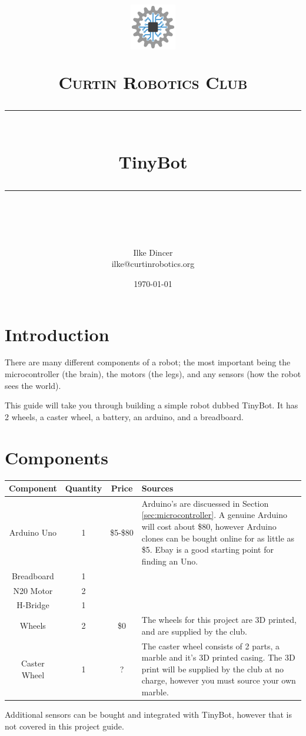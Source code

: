 \documentclass[a4paper,12pt]{article}
\title{	
    \begin{center}
        \includegraphics[width=0.15\textwidth]{CRoCLogo(mediumquality).png}
    \end{center}
	\normalfont\normalsize
	\textsc{Curtin Robotics Club}\\ %
	\vspace{25pt} %
	\rule{\linewidth}{0.5pt}\\ %
	\vspace{20pt} %
    {\huge TinyBot }\\
	\vspace{12pt} %
	\rule{\linewidth}{2pt}\\ %
	\vspace{12pt} %
}
\author{\LARGE Ilke Dincer \\ \small ilke@curtinrobotics.org} %
\date{\normalsize\today} %
\begin{document}
\maketitle

\pagebreak
{}
\tableofcontents

\pagebreak
{}

\section{Introduction}

There are many different components of a robot; the most important being the microcontroller (the brain), the motors (the legs), and any sensors (how the robot sees the world).

This guide will take you through building a simple robot dubbed TinyBot. It has 2 wheels, a caster wheel, a battery, an arduino, and a breadboard.


\section{Components}
 
\begin{tabularx}{\linewidth}{cccX}
    \toprule
    Component & Quantity & Price & Sources \\ \midrule
    Arduino Uno & 1 & \$5-\$80 & Arduino's are discuessed in Section \ref{sec:microcontroller}. A genuine Arduino will cost about \$80, however Arduino clones can be bought online for as little as \$5. Ebay is a good starting point for finding an Uno. \\
    Breadboard & 1 & & \\
    N20 Motor & 2 & & \\
    H-Bridge & 1 & & \\  
    Wheels & 2& \$0 & The wheels for this project are 3D printed, and are supplied by the club. \\
    Caster Wheel & 1 & ? & The caster wheel consists of 2 parts, a marble and it's 3D printed casing. The 3D print will be supplied by the club at no charge, however you must source your own marble.\\
    \bottomrule
\end{tabularx}

\bigskip

Additional sensors can be bought and integrated with TinyBot, however that is not covered in this project guide. 
\end{document}
